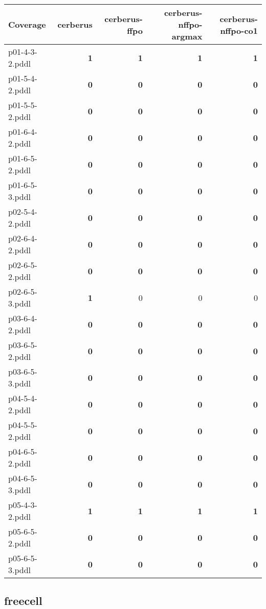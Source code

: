 \documentclass{article}
\begin{document}
\begin{tabular}{@{}lrrrr@{}}
Coverage & cerberus & cerberus-ffpo & cerberus-nffpo-argmax & cerberus-nffpo-co1 \\
\midrule
p01-4-3-2.pddl & \textbf{1} & \textbf{1} & \textbf{1} & \textbf{1} \\
p01-5-4-2.pddl & \textbf{0} & \textbf{0} & \textbf{0} & \textbf{0} \\
p01-5-5-2.pddl & \textbf{0} & \textbf{0} & \textbf{0} & \textbf{0} \\
p01-6-4-2.pddl & \textbf{0} & \textbf{0} & \textbf{0} & \textbf{0} \\
p01-6-5-2.pddl & \textbf{0} & \textbf{0} & \textbf{0} & \textbf{0} \\
p01-6-5-3.pddl & \textbf{0} & \textbf{0} & \textbf{0} & \textbf{0} \\
p02-5-4-2.pddl & \textbf{0} & \textbf{0} & \textbf{0} & \textbf{0} \\
p02-6-4-2.pddl & \textbf{0} & \textbf{0} & \textbf{0} & \textbf{0} \\
p02-6-5-2.pddl & \textbf{0} & \textbf{0} & \textbf{0} & \textbf{0} \\
p02-6-5-3.pddl & \textbf{1} & 0 & 0 & 0 \\
p03-6-4-2.pddl & \textbf{0} & \textbf{0} & \textbf{0} & \textbf{0} \\
p03-6-5-2.pddl & \textbf{0} & \textbf{0} & \textbf{0} & \textbf{0} \\
p03-6-5-3.pddl & \textbf{0} & \textbf{0} & \textbf{0} & \textbf{0} \\
p04-5-4-2.pddl & \textbf{0} & \textbf{0} & \textbf{0} & \textbf{0} \\
p04-5-5-2.pddl & \textbf{0} & \textbf{0} & \textbf{0} & \textbf{0} \\
p04-6-5-2.pddl & \textbf{0} & \textbf{0} & \textbf{0} & \textbf{0} \\
p04-6-5-3.pddl & \textbf{0} & \textbf{0} & \textbf{0} & \textbf{0} \\
p05-4-3-2.pddl & \textbf{1} & \textbf{1} & \textbf{1} & \textbf{1} \\
p05-6-5-2.pddl & \textbf{0} & \textbf{0} & \textbf{0} & \textbf{0} \\
p05-6-5-3.pddl & \textbf{0} & \textbf{0} & \textbf{0} & \textbf{0} \\
\end{tabular}

\hypertarget{coverage-freecell}{}
\subsection*{freecell}
\end{document}
